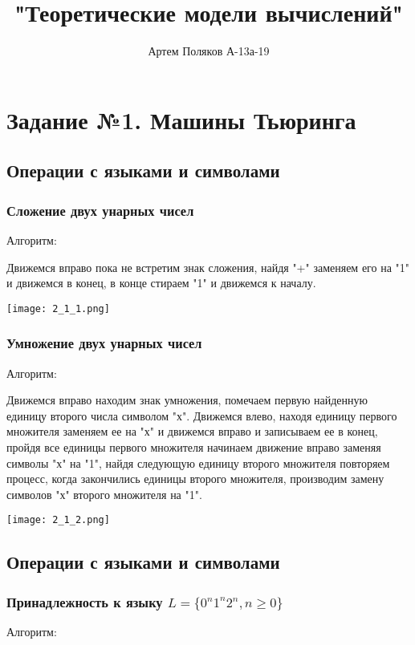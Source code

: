 \documentclass{article}
\title{"Теоретические модели вычислений"}
\author{Артем Поляков А-13а-19}
\begin{document}
\maketitle
\newpage
\section{Задание №1. Машины Тьюринга}
\subsection{Операции с языками и символами}
\subsubsection{Сложение двух унарных чисел}

Алгоритм:

Движемся вправо пока не встретим знак сложения, найдя "+" заменяем его на "1" и движемся в конец, в конце стираем "1" и движемся к началу.

\texttt{[image: 2\_1\_1.png]}

\newpage
\subsubsection{Умножение двух унарных чисел}

Алгоритм:

Движемся вправо находим знак умножения, помечаем первую найденную единицу второго числа символом "х". Движемся влево, находя единицу первого множителя заменяем ее на "х" и движемся вправо и записываем ее в конец, пройдя все единицы первого множителя начинаем движение вправо заменяя символы "х" на "1", найдя следующую единицу второго множителя повторяем процесс, когда закончились единицы второго множителя, производим замену символов "х" второго множителя на "1".

\texttt{[image: 2\_1\_2.png]}

\newpage
\subsection{Операции с языками и символами}

\subsubsection{Принадлежность к языку \(L = \{0^n1^n2^n, n \geq 0 \}\)}

Алгоритм:
\end{document}
